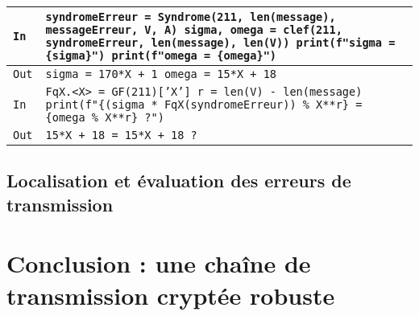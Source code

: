 \documentclass[titlepage]{article}
\begin{document}
        \begin{tabularx}{12cm}{|p{0.60cm}|X|}
            \hline
            \rowcolor{gray}
            \texttt{In}
            & 
            \texttt{syndromeErreur = Syndrome(211, len(message), \newline
            messageErreur, V, A) \newline
            sigma, omega = clef(211, syndromeErreur, len(message), len(V)) \newline
            print(f"sigma = \{sigma\}") \newline
            print(f"omega = \{omega\}")}
            \\
            \hline
            \texttt{Out}
            &
            \texttt{sigma = 170*X + 1 \newline
            omega = 15*X + 18}
            \\
            \hline
            \rowcolor{gray}
            \texttt{In}
            & 
            \texttt{FqX.<X> = GF(211)['X'] \newline
            r = len(V) - len(message) \newline
            print(f"\{(sigma * FqX(syndromeErreur)) \% X**r\} = \{omega \% X**r\} ?")}
            \\
            \hline
            \texttt{Out}
            &
            \texttt{15*X + 18 = 15*X + 18 ?}
            \\
            \hline
        \end{tabularx}
        \bigbreak

        \subsection{Localisation et évaluation des erreurs de transmission}
    \section{Conclusion : une chaîne de transmission cryptée robuste}
\end{document}
